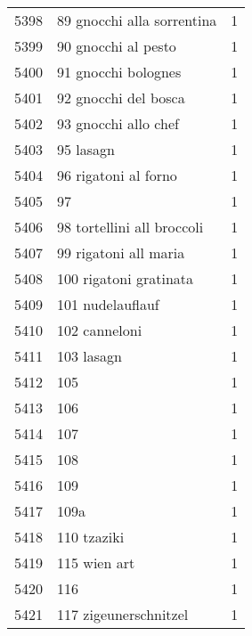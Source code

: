 \begin{tabular}{llr}
5398 &                         89 gnocchi alla sorrentina &      1 \\
5399 &                                90 gnocchi al pesto &      1 \\
5400 &                                91 gnocchi bolognes &      1 \\
5401 &                               92 gnocchi del bosca &      1 \\
5402 &                               93 gnocchi allo chef &      1 \\
5403 &                                          95 lasagn &      1 \\
5404 &                               96 rigatoni al forno &      1 \\
5405 &                                                 97 &      1 \\
5406 &                         98 tortellini all broccoli &      1 \\
5407 &                              99 rigatoni all maria &      1 \\
5408 &                             100 rigatoni gratinata &      1 \\
5409 &                                   101 nudelauflauf &      1 \\
5410 &                                      102 canneloni &      1 \\
5411 &                                         103 lasagn &      1 \\
5412 &                                                105 &      1 \\
5413 &                                                106 &      1 \\
5414 &                                                107 &      1 \\
5415 &                                                108 &      1 \\
5416 &                                                109 &      1 \\
5417 &                                               109a &      1 \\
5418 &                                        110 tzaziki &      1 \\
5419 &                                       115 wien art &      1 \\
5420 &                                                116 &      1 \\
5421 &                              117 zigeunerschnitzel &      1 \\

\end{tabular}
